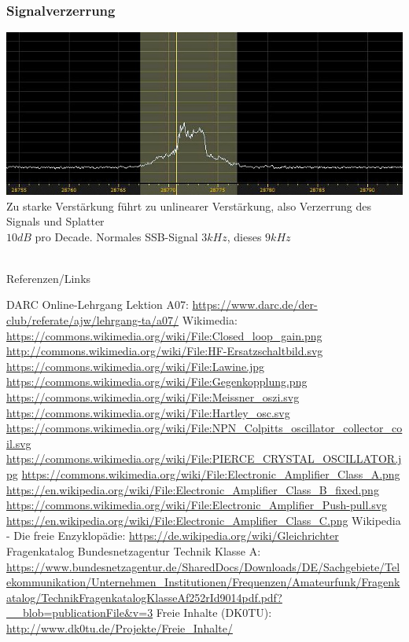 \begin{frame}
  \frametitle{Signalverzerrung}
  \begin{center}
    \includegraphics[width=1\textwidth,height=.6\textheight,keepaspectratio]{a07/splatter.jpg}\\[1em]
    Zu starke Verstärkung führt zu unlinearer Verstärkung, also Verzerrung des Signals und Splatter\\
    $10dB$ pro Decade. Normales SSB-Signal $3kHz$, dieses $9kHz$
  \end{center}
\end{frame}

\renewcommand{\refname}{Referenzen}

\hypertarget{refs}{}
\textcolor{white}{} \\ %
\Large Referenzen/Links
\footnotesize

\begin{thebibliography}{}
    DARC Online-Lehrgang Lektion A07:
    \url{https://www.darc.de/der-club/referate/ajw/lehrgang-ta/a07/}
   	Wikimedia:
    \url{https://commons.wikimedia.org/wiki/File:Closed_loop_gain.png}
    \url{http://commons.wikimedia.org/wiki/File:HF-Ersatzschaltbild.svg}
    \url{https://commons.wikimedia.org/wiki/File:Lawine.jpg}
    \url{https://commons.wikimedia.org/wiki/File:Gegenkopplung.png}
    \url{https://commons.wikimedia.org/wiki/File:Meissner_oszi.svg}
    \url{https://commons.wikimedia.org/wiki/File:Hartley_osc.svg}
    \url{https://commons.wikimedia.org/wiki/File:NPN_Colpitts_oscillator_collector_coil.svg}
    \url{https://commons.wikimedia.org/wiki/File:PIERCE_CRYSTAL_OSCILLATOR.jpg}
    \url{https://commons.wikimedia.org/wiki/File:Electronic_Amplifier_Class_A.png}
    \url{https://en.wikipedia.org/wiki/File:Electronic_Amplifier_Class_B_fixed.png}
    \url{https://commons.wikimedia.org/wiki/File:Electronic_Amplifier_Push-pull.svg}
    \url{https://en.wikipedia.org/wiki/File:Electronic_Amplifier_Class_C.png}
    \url{}
    \url{}
    \url{}
    \url{}
      Wikipedia - Die freie Enzyklopädie:
    \url{https://de.wikipedia.org/wiki/Gleichrichter}
     Fragenkatalog Bundesnetzagentur Technik Klasse A:                   
    \url{https://www.bundesnetzagentur.de/SharedDocs/Downloads/DE/Sachgebiete/Telekommunikation/Unternehmen_Institutionen/Frequenzen/Amateurfunk/Fragenkatalog/TechnikFragenkatalogKlasseAf252rId9014pdf.pdf?__blob=publicationFile&v=3}
      Freie Inhalte (DK0TU):
    \url{http://www.dk0tu.de/Projekte/Freie_Inhalte/}
\end{thebibliography} 


